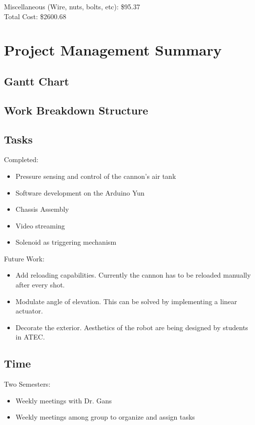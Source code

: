 \documentclass[letterpaper,12pt]{article}
\begin{document}
Miscellaneous (Wire, nuts, bolts, etc): \$95.37 \\

Total Cost: \$2600.68

\pagebreak

\section{Project Management Summary}
\label{sec:projman}

\subsection{Gantt Chart}



\subsection{Work Breakdown Structure}


\subsection{Tasks}
Completed:
\begin{itemize}
    \item Pressure sensing and control of the cannon's air tank
    \item Software development on the Arduino Yun
    \item Chassis Assembly
    \item Video streaming
    \item Solenoid as triggering mechanism
\end{itemize}

Future Work:
\begin{itemize}
    \item Add reloading capabilities. Currently the cannon has to be reloaded
        manually after every shot.
    \item Modulate angle of elevation. This can be solved by implementing
        a linear actuator.
    \item Decorate the exterior. Aesthetics of the robot are being designed by
        students in ATEC.
\end{itemize}

\subsection{Time}
Two Semesters:
\begin{itemize}
    \item Weekly meetings with Dr. Gans
    \item Weekly meetings among group to organize and assign tasks
\end{itemize}
\end{document}
